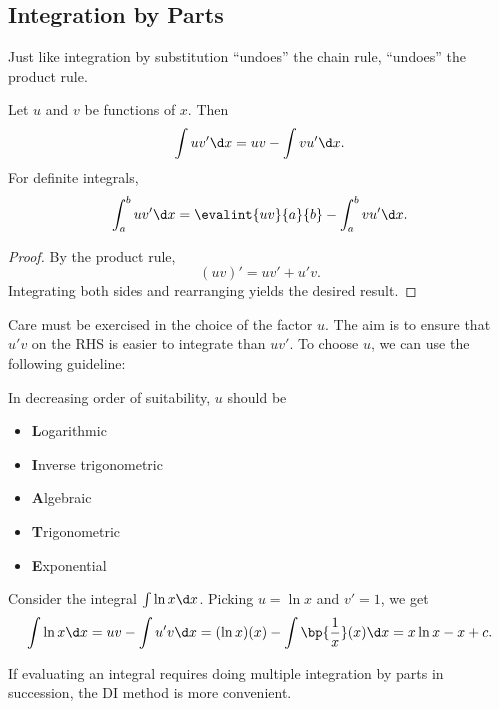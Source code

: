 \subsection{Integration by Parts}

Just like integration by substitution ``undoes'' the chain rule,  ``undoes'' the product rule.

\begin{proposition}
    Let $u$ and $v$ be functions of $x$. Then \[\int u v' \d x = uv - \int v u' \d x.\] For definite integrals, \[\int_a^b u v' \d x = \evalint{uv}{a}{b} - \int_a^b v u' \d x.\]
\end{proposition}
\begin{proof}
    By the product rule, \[(uv)' = uv' + u'v.\] Integrating both sides and rearranging yields the desired result.
\end{proof}

Care must be exercised in the choice of the factor $u$. The aim is to ensure that $u' v$ on the RHS is easier to integrate than $u v'$. To choose $u$, we can use the following guideline:

\begin{recipe}[LIATE]
    In decreasing order of suitability, $u$ should be
    \begin{itemize}
        \item \textbf{L}ogarithmic
        \item \textbf{I}nverse trigonometric
        \item \textbf{A}lgebraic
        \item \textbf{T}rigonometric
        \item \textbf{E}xponential
    \end{itemize}
\end{recipe}

\begin{example}
    Consider the integral $\int \ln x \d x$. Picking $u = \ln x$ and $v' = 1$, we get \[\int \ln x \d x = uv - \int u' v \d x = (\ln x)(x) - \int \bp{\frac1x} (x) \d x = x\ln x - x + c.\]
\end{example}

If evaluating an integral requires doing multiple integration by parts in succession, the DI method is more convenient.

